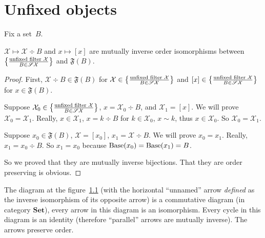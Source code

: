 \chapter{Unfixed objects}


Fix a set~$B$.

\begin{lem}
$\mathcal{X}\mapsto\mathcal{X}\div B$ and $x\mapsto[x]$ are
mutually inverse order isomorphisms between
$\left\{ \frac{\text{unfixed filter }\mathcal{X}}{B\in\mathscr{S}\mathcal{X}}\right\}$ and $\mathfrak{F}(B)$.
\end{lem}

\begin{proof}
First, $\mathcal{X}\div B\in\mathfrak{F}(B)$ for
$\mathcal{X}\in\left\{ \frac{\text{unfixed filter }\mathcal{X}}{B\in\mathscr{S}\mathcal{X}}\right\}$ and
$[x]\in\left\{ \frac{\text{unfixed filter }\mathcal{X}}{B\in\mathscr{S}\mathcal{X}}\right\}$
for $x\in\mathfrak{F}(B)$.

Suppose $\mathcal{X}_0\in\left\{ \frac{\text{unfixed filter }\mathcal{X}}{B\in\mathscr{S}\mathcal{X}}\right\}$,
$x=\mathcal{X}_0\div B$, and $\mathcal{X}_1=[x]$. We will prove
$\mathcal{X}_0=\mathcal{X}_1$. Really, $x\in\mathcal{X}_1$,
$x=k\div B$ for $k\in\mathcal{X}_0$, $x\sim k$, thus
$x\in\mathcal{X}_0$. So $\mathcal{X}_0=\mathcal{X}_1$.

Suppose $x_0\in\mathfrak{F}(B)$, $\mathcal{X}=[x_0]$,
$x_1=\mathcal{X}\div B$. We will prove $x_0=x_1$. Really,
$x_1=x_0\div B$. So $x_1=x_0$ because
$\operatorname{Base}(x_0)=\operatorname{Base}(x_1)=B$.

So we proved that they are mutually inverse bijections. That
they are order preserving is obvious.
\end{proof}

\begin{thm}
The diagram at the figure~\ref{unfix-dia} (with the horizontal ``unnamed''
arrow \emph{defined} as the inverse isomorphism of its opposite arrow)
is a commutative diagram (in category $\mathbf{Set}$), every arrow
in this diagram is an isomorphism. Every cycle in this diagram is
an identity (therefore ``parallel'' arrows are mutually inverse).
The arrows preserve order.

\begin{figure}[ht]
\caption{\label{unfix-dia}}

\end{figure}
\end{thm}

